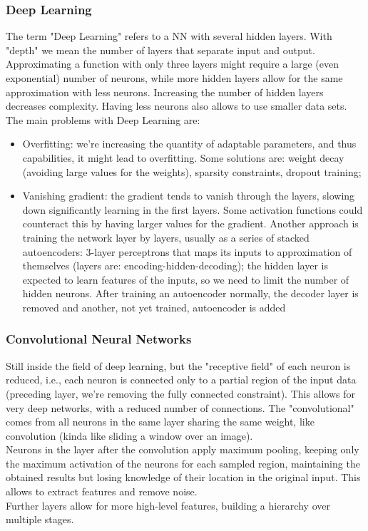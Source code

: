 \documentclass{article}
\begin{document}
	\subsubsection{Deep Learning}
	The term "Deep Learning" refers to a NN with several hidden layers. With "depth" we mean the number of layers that separate input and output. \\
	Approximating a function with only three layers might require a large (even exponential) number of neurons, while more hidden layers allow for the same approximation with less neurons. Increasing the number of hidden layers decreases complexity. Having less neurons also allows to use smaller data sets.\\
	
	The main problems with Deep Learning are: 
	\begin{itemize}
		\item Overfitting: we're increasing the quantity of adaptable parameters, and thus capabilities, it might lead to overfitting. Some solutions are: weight decay (avoiding large values for the weights), sparsity constraints, dropout training; 
		\item Vanishing gradient: the gradient tends to vanish through the layers, slowing down significantly learning in the first layers. Some activation functions could counteract this by having larger values for the gradient. Another approach is training the network layer by layers, usually as a series of stacked autoencoders: 3-layer perceptrons that maps its inputs to approximation of themselves (layers are: encoding-hidden-decoding); the hidden layer is expected to learn features of the inputs, so we need to limit the number of hidden neurons. After training an autoencoder normally, the decoder layer is removed and another, not yet trained, autoencoder is added
	\end{itemize}
	
	\subsubsection{Convolutional Neural Networks}
	Still inside the field of deep learning, but the "receptive field" of each neuron is reduced, i.e., each neuron is connected only to a partial region of the input data (preceding layer, we're removing the fully connected constraint). This allows for very deep networks, with a reduced number of connections. The "convolutional" comes from all neurons in the same layer sharing the same weight, like convolution (kinda like sliding a window over an image).\\
	Neurons in the layer after the convolution apply maximum pooling, keeping only the maximum activation of the neurons for each sampled region, maintaining the obtained results but losing knowledge of their location in the original input. This allows to extract features and remove noise. \\
	Further layers allow for more high-level features, building a hierarchy over multiple stages.\\
	
\end{document}

